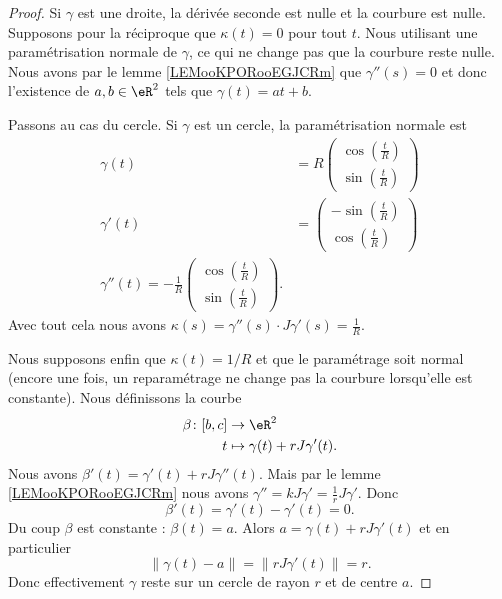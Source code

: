 \begin{proof}
    Si \( \gamma\) est une droite, la dérivée seconde est nulle et la courbure est nulle. Supposons pour la réciproque que \( \kappa(t)=0\) pour tout \( t\). Nous utilisant une paramétrisation normale de \( \gamma\), ce qui ne change pas que la courbure reste nulle. Nous avons par le lemme \ref{LEMooKPORooEGJCRm} que \( \gamma''(s)=0\) et donc l'existence de \( a,b\in \eR^2\) tels que \( \gamma(t)=at+b\).

    Passons au cas du cercle. Si \( \gamma\) est un cercle, la paramétrisation normale est
    \begin{subequations}
        \begin{align}
            \gamma(t)&=R\begin{pmatrix}
                \cos(\frac{ t }{ R })    \\ 
                \sin(\frac{ t }{ R })    
            \end{pmatrix}\\
            \gamma'(t)&=\begin{pmatrix}
                -\sin(\frac{ t }{ R })    \\ 
                \cos(\frac{ t }{ R })    
            \end{pmatrix}\\
            \gamma''(t)=-\frac{1}{ R }\begin{pmatrix}
                \cos(\frac{ t }{ R })    \\ 
                \sin(\frac{ t }{ R })    
            \end{pmatrix}.
        \end{align}
    \end{subequations}
    Avec tout cela nous avons \( \kappa(s)=\gamma''(s)\cdot J\gamma'(s)=\frac{1}{ R }\).

    Nous supposons enfin que \( \kappa(t)=1/R\) et que le paramétrage soit normal (encore une fois, un reparamétrage ne change pas la courbure lorsqu'elle est constante). Nous définissons la courbe
    \begin{equation}
        \begin{aligned}
            \beta\colon \mathopen[ b , c \mathclose]&\to \eR^2 \\
            t&\mapsto \gamma(t)+rJ\gamma'(t). 
        \end{aligned}
    \end{equation}
    Nous avons \( \beta'(t)=\gamma'(t)+rJ\gamma''(t)\). Mais par le lemme \ref{LEMooKPORooEGJCRm} nous avons \( \gamma''=kJ\gamma'=\frac{1}{ r }J\gamma'\). Donc
    \begin{equation}
        \beta'(t)=\gamma'(t)-\gamma'(t)=0.
    \end{equation}
    Du coup \( \beta\) est constante : \( \beta(t)=a\). Alors \( a=\gamma(t)+rJ\gamma'(t)\) et en particulier
    \begin{equation}
        \| \gamma(t)-a \|=\| rJ\gamma'(t) \|=r.
    \end{equation}
    Donc effectivement \( \gamma\) reste sur un cercle de rayon \( r\) et de centre \( a\).
\end{proof}

